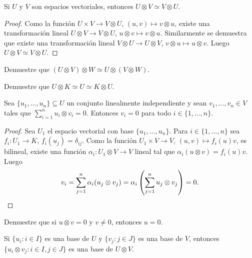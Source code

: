 \begin{lemma}
	Si $U$ y $V$ son espacios vectoriales, entonces 
	$U\otimes V\simeq V\otimes U$.
\end{lemma}

\begin{proof}
	Como la función $U\times V\to V\otimes U$, $(u,v)\mapsto v\otimes u$,
	existe una transformación lineal $U\otimes V\to V\otimes U$, $u\otimes
	v\mapsto v\otimes u$. Similarmente se demuestra que existe una
	transformación lineal $V\otimes U\to U\otimes V$, $v\otimes u\mapsto
	u\otimes v$. Luego $U\otimes V\simeq V\otimes U$.
\end{proof}

\begin{exercise}
	\label{xca:UxVxW}
	Demuestre que $(U\otimes V)\otimes W\simeq U\otimes(V\otimes W)$.
\end{exercise}

\begin{exercise}
	\label{xca:UxK}
	Demuestre que $U\otimes K\simeq U\simeq K\otimes U$.
\end{exercise}

\begin{lemma}
	\label{lem:U_LI}
	Sea $\{u_1,\dots,u_n\}\subseteq U$ un conjunto linealmente independiente y
	sean $v_1,\dots,v_n\in V$ tales que $\sum_{i=1}^n u_i\otimes v_i=0$.
	Entonces $v_i=0$ para todo $i\in\{1,\dots,n\}$.
\end{lemma}

\begin{proof}
    Sea $U_1$ el espacio vectorial con base $\{u_1,\dots,u_n\}$. 
	Para $i\in\{1,\dots,n\}$ sea $f_i\colon U_1\to K$, $f_i(u_j)=\delta_{ij}$.
	Como la función $U_1\times V\to V$, $(u,v)\mapsto f_i(u)v$, es bilineal, existe una función
	$\alpha_i\colon U_1\otimes V\to V$ lineal tal que $\alpha_i(u\otimes
	v)=f_i(u)v$. Luego
	\[
		v_i=\sum_{j=1}^n\alpha_i(u_j\otimes v_j)=\alpha_i\left(\sum_{j=1}^nu_j\otimes v_j\right)=0.\qedhere
	\]
\end{proof}

\begin{exercise}
	\label{xca:uxv=0}
	Demuestre que si $u\otimes v=0$ y $v\ne 0$, entonces $u=0$.
\end{exercise}

\begin{theorem}
	Si $\{u_i:i\in I\}$ es una base de $U$ y $\{v_j:j\in J\}$ es una base de
	$V$, entonces $\{u_i\otimes v_j:i\in I,j\in J\}$ es una base de $U\otimes
	V$.
\end{theorem}

